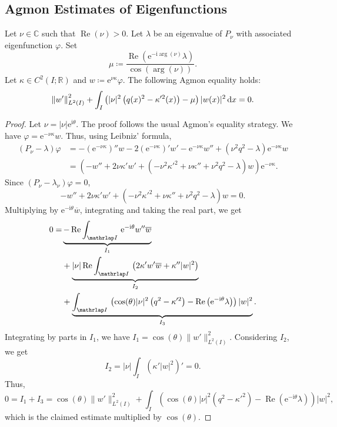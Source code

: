 \documentclass[AHL,Unicode,longabstracts,published]{cedram}
\newcommand{\1}{\mathds 1}
\DeclareMathOperator{\Ree}{Re}
\newcommand{\R}{\mathbb{R}}
\newcommand{\C}{\mathbb{C}}
\newcommand{\diff}[1][-3]{\ensuremath{\mathop{}\mkern#1mu\mathrm{d}}}
\newcommand{\eu}{\mathrm e}
\newcommand{\iu}{\mathrm i}
\renewcommand{\th}{\theta}
\renewcommand{\l}{\lambda}
\newcommand{\f}{\varphi}
\DeclareMathOperator{\Ree}{Re}
\begin{document}
\subsection{Agmon Estimates of Eigenfunctions}\label{sec-agmon}

\begin{prop}\label{th:agmon-eq}
Let $\nu \in \C$ such that $\Ree(\nu)>0$. Let $\l$ be an eigenvalue of $P_\nu$ with associated eigenfunction $\f$. Set
\[
\mu\coloneqq \frac{\Ree\left(\eu^{-\iu\arg(\nu)}\lambda\right)}{\cos(\arg(\nu))}.
\]
Let $\kappa \in C^2(I;\R) $ and $w \coloneqq \eu^{\nu \kappa}\f$. The following Agmon equality holds:
\[
\left\|w'\right\|_{L^2(I)}^2 + \int_I \left(|\nu|^2\left(q(x)^2 - \kappa'^2(x)\right) - \mu\right)|w(x)|^2 \diff x = 0.
\]
\end{prop}

\begin{proof}
Let $\nu = |\nu|\eu^{\iu\th}$. The proof follows the usual Agmon's equality strategy. We have $\f = \eu^{-\nu \kappa} w$. Thus, using Leibniz' formula,
\begin{align*}
(P_\nu - \l) \f &=-\left(\eu^{-\nu \kappa}\right)'' w - 2\left(\eu^{-\nu \kappa}\right)' w' - \eu^{-\nu \kappa} w'' +\left(\nu^2 q^2-\l\right) \eu^{-\nu \kappa} w\\
&=\left(-w'' +2\nu \kappa' w' +\left(-\nu^2 \kappa'^2 +\nu \kappa'' +\nu^2 q^2 - \l\right)w \right)\eu^{-\nu \kappa}.
\end{align*}
Since $(P_\nu - \l_\nu)\f = 0$,
\begin{equation}
-w'' +2\nu \kappa' w' +\left(-\nu^2 \kappa'^2 +\nu \kappa'' +\nu^2 q^2 - \l\right)w = 0.
\end{equation}
Multiplying by $\eu^{-\iu\th}\overline{w}$, integrating and taking the real part, we get
\begin{align*}
0=& \underbrace{-\Ree\int_{\mathrlap I}\, \eu^{-\iu\th}w'' \overline{w}}_{I_1}\\
&+\underbrace{|\nu|\Ree\int_{\mathrlap I}\, \left(2\kappa'w' \overline{w} + \kappa''|w|^2\right)}_{I_2}\\
&+\underbrace{\int_{\mathrlap I}\,\left(\cos(\th)|\nu|^2\left(q^2-\kappa'^2\right) - \Ree\left(\eu^{-\iu\th}\l\right)\right) |w|^2}_{I_3}.
\end{align*}
Integrating by parts in $I_1$, we have $I_1 = \cos(\th) \|w'\|_{L^2(I)}^2$. Considering $I_2$, we get
\begin{equation*}
I_2 =|\nu|\int_I\left(\kappa'|w|^2\right)' =0.
\end{equation*}
Thus,
\[
0 = I_1 + I_3 =\cos(\th)\|w'\|^2_{L^2(I)} + \int_I\left(\cos(\th)|\nu|^2\left(q^2-\kappa'^2\right) - \Ree\left(\eu^{-\iu\th}\l\right)\right) |w|^2,
\]
which is the claimed estimate multiplied by $\cos(\th)$.
\end{proof}
\end{document}
